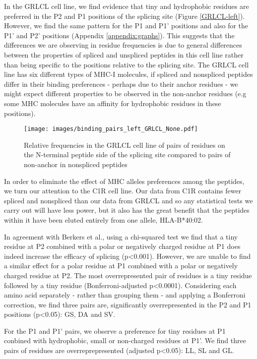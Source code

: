 \documentclass[10pt,a4paper,twoside,twocolumn]{article}
\begin{document}
In the GRLCL cell line, we find evidence that tiny and hydrophobic residues are preferred in the P2 and P1 positions of the splicing site (Figure \ref{GRLCL-left}). However, we find the same pattern for the P1 and P1' positions and also for the P1' and P2' positions (Appendix \ref{appendix:graphs}). This suggests that the differences we are observing in residue frequencies is due to general differences between the properties of spliced and unspliced peptides in this cell line rather than being specific to the positions relative to the splicing site. The GRLCL cell line has six different types of MHC-I molecules, if spliced and nonspliced peptides differ in their binding preferences  - perhaps due to their anchor residues - we might expect different properties to be observed in the non-anchor residues (e.g some MHC molecules have an affinity for hydrophobic residues in these positions).

	\begin{figure}
		\texttt{[image: images/binding\_pairs\_left\_GRLCL\_None.pdf]}
		\caption{Relative frequencies in the GRLCL cell line of pairs of residues on the N-terminal peptide side of the splicing site compared to pairs of non-anchor in nonspliced peptides}
		
	\end{figure}


In order to eliminate the effect of MHC alleles preferences among the peptides, we turn our attention to the C1R cell line. Our data from C1R contains fewer spliced and nonspliced than our data from GRLCL and so any statistical tests we carry out will have less power, but it also has the great benefit that the peptides within it have been eluted entirely from one allele, HLA-B*40:02.

In agreement with Berkers et al., using a chi-squared test we find that a tiny residue at P2 combined with a polar or negatively charged residue at P1 does indeed increase the efficacy of splicing (p<0.001). However, we are unable to find a similar effect for a polar residue at P1 combined with a polar or negatively charged residue at P2. The most overrepresented pair of residues is a tiny residue followed by a tiny residue (Bonferroni-adjusted p<0.0001). Considering each amino acid separately - rather than grouping them - and applying a Bonferroni correction, we find three pairs are, significantly overrepresented in the P2 and P1 positions (p<0.05): GS, DA and SV.

For the P1 and P1' pairs, we observe a preference for tiny residues at P1 conbined with hydrophobic, small or non-charged residues at P1'. We find three pairs of residues are overreprepresented (adjusted p<0.05): LL, SL and GL. 
\end{document}
